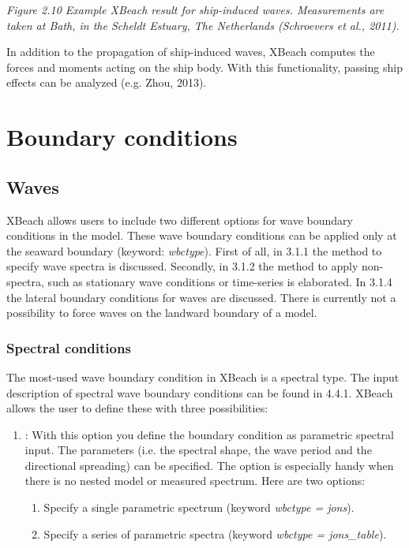 \documentclass{article}
\begin{document}
\noindent \textit{Figure 2.10 Example XBeach result for ship-induced waves. Measurements are taken at Bath, in the Scheldt Estuary, The Netherlands (Schroevers et al., 2011).}

\noindent 

\noindent In addition to the propagation of ship-induced waves, XBeach computes the forces and moments acting on the ship body. With this functionality, passing ship effects can be analyzed (e.g. Zhou, 2013).  

\noindent \eject 


\section{ Boundary conditions}


\subsection{ Waves}

\noindent XBeach allows users to include two different options for wave boundary conditions in the model. These wave boundary conditions can be applied only at the seaward boundary (keyword: \textit{wbctype}). First of all, in 3.1.1 the method to specify wave spectra is discussed. Secondly, in 3.1.2 the method to apply non-spectra, such as stationary wave conditions or time-series is elaborated. In 3.1.4 the lateral boundary conditions for waves are discussed. There is currently not a possibility to force waves on the landward boundary of a model. 


\subsubsection{ Spectral conditions}

\noindent The most-used wave boundary condition in XBeach is a spectral type. The input description of spectral wave boundary conditions can be found in 4.4.1.  XBeach allows the user to define these with three possibilities:

\noindent 

\begin{enumerate}
\item  {}: With this option you define the boundary condition as parametric spectral input. The parameters (i.e. the spectral shape, the wave period and the directional spreading) can be specified. The option is especially handy when there is no nested model or measured spectrum. Here are two options:

\begin{enumerate}
\item  Specify a single parametric spectrum (keyword \textit{wbctype = jons}).

\item  Specify a series of parametric spectra (keyword \textit{wbctype = jons\_table}).
\end{enumerate}
\end{enumerate}
\end{document}
